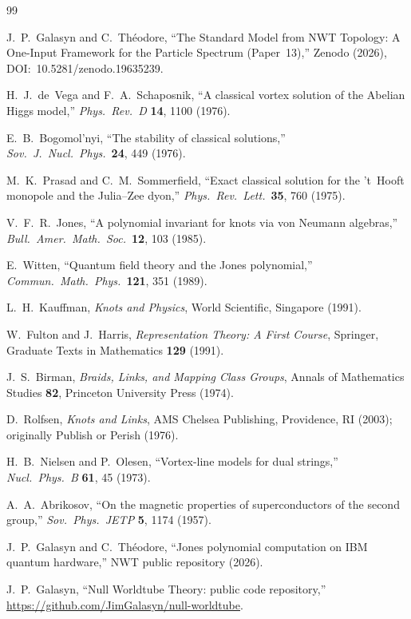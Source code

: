 \documentclass[11pt]{article}
\begin{document}
\begin{thebibliography}{99}

  J.~P.~Galasyn and C.~Th\'eodore,
  ``The Standard Model from NWT Topology: A One-Input Framework
  for the Particle Spectrum (Paper~13),''
  Zenodo (2026), DOI:~10.5281/zenodo.19635239.

  H.~J.~de~Vega and F.~A.~Schaposnik,
  ``A classical vortex solution of the Abelian Higgs model,''
  \emph{Phys.\ Rev.\ D} \textbf{14}, 1100 (1976).

  E.~B.~Bogomol'nyi,
  ``The stability of classical solutions,''
  \emph{Sov.\ J.\ Nucl.\ Phys.}\ \textbf{24}, 449 (1976).

  M.~K.~Prasad and C.~M.~Sommerfield,
  ``Exact classical solution for the 't~Hooft monopole
  and the Julia--Zee dyon,''
  \emph{Phys.\ Rev.\ Lett.}\ \textbf{35}, 760 (1975).

  V.~F.~R.~Jones,
  ``A polynomial invariant for knots via von Neumann algebras,''
  \emph{Bull.\ Amer.\ Math.\ Soc.}\ \textbf{12}, 103 (1985).

  E.~Witten,
  ``Quantum field theory and the Jones polynomial,''
  \emph{Commun.\ Math.\ Phys.}\ \textbf{121}, 351 (1989).

  L.~H.~Kauffman,
  \emph{Knots and Physics},
  World Scientific, Singapore (1991).

  W.~Fulton and J.~Harris,
  \emph{Representation Theory: A First Course},
  Springer, Graduate Texts in Mathematics \textbf{129} (1991).

  J.~S.~Birman,
  \emph{Braids, Links, and Mapping Class Groups},
  Annals of Mathematics Studies \textbf{82},
  Princeton University Press (1974).

  D.~Rolfsen,
  \emph{Knots and Links},
  AMS Chelsea Publishing, Providence, RI (2003);
  originally Publish or Perish (1976).

  H.~B.~Nielsen and P.~Olesen,
  ``Vortex-line models for dual strings,''
  \emph{Nucl.\ Phys.\ B} \textbf{61}, 45 (1973).

  A.~A.~Abrikosov,
  ``On the magnetic properties of superconductors of the
  second group,''
  \emph{Sov.\ Phys.\ JETP} \textbf{5}, 1174 (1957).

  J.~P.~Galasyn and C.~Th\'eodore,
  ``Jones polynomial computation on IBM quantum hardware,''
  NWT public repository (2026).

  J.~P.~Galasyn,
  ``Null Worldtube Theory: public code repository,''
  \url{https://github.com/JimGalasyn/null-worldtube}.

\end{thebibliography}
\end{document}
